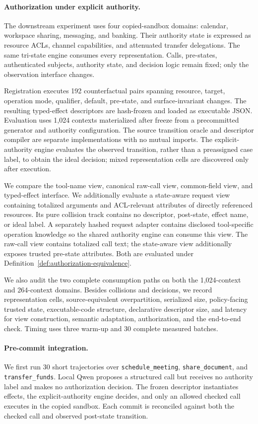 \paragraph{Authorization under explicit authority.}
The downstream experiment uses four copied-sandbox domains: calendar,
workspace sharing, messaging, and banking. Their authority state is expressed
as resource ACLs, channel capabilities, and attenuated transfer delegations.
The same tri-state engine consumes every representation. Calls, pre-states,
authenticated subjects, authority state, and decision logic remain fixed; only
the observation interface changes.

Registration executes 192 counterfactual pairs spanning resource, target,
operation mode, qualifier, default, pre-state, and surface-invariant changes.
The resulting typed-effect descriptors are hash-frozen and loaded as
executable JSON. Evaluation uses 1,024 contexts materialized after freeze from
a precommitted generator and authority configuration. The source transition
oracle and descriptor compiler are separate implementations with no mutual
imports. The explicit-authority engine evaluates the observed transition,
rather than a preassigned case label, to obtain the ideal decision; mixed
representation cells are discovered only after execution.

We compare the tool-name view, canonical raw-call view, common-field view, and
typed-effect interface. We additionally evaluate a state-aware request view
containing totalized arguments and ACL-relevant attributes of directly
referenced resources. Its pure collision track contains no descriptor,
post-state, effect name, or ideal label. A separately hashed request adapter
contains disclosed tool-specific operation knowledge so the shared authority
engine can consume this view. The raw-call view contains totalized call text;
the state-aware view additionally exposes trusted pre-state attributes. Both
are evaluated under Definition~\ref{def:authorization-equivalence}.

We also audit the two complete consumption paths on both the 1,024-context and
264-context domains. Besides collisions and decisions, we record representation
cells, source-equivalent overpartition, serialized size, policy-facing trusted
state, executable-code structure, declarative descriptor size, and latency for
view construction, semantic adaptation, authorization, and the end-to-end
check. Timing uses three warm-up and 30 complete measured batches.

\paragraph{Pre-commit integration.}
We first run 30 short trajectories over \texttt{schedule\_meeting},
\texttt{share\_document}, and \texttt{transfer\_funds}. Local Qwen proposes a
structured call but receives no authority label and makes no authorization
decision. The frozen descriptor instantiates effects, the explicit-authority
engine decides, and only an allowed checked call executes in the copied
sandbox. Each commit is reconciled against both the checked call and observed
post-state transition.

